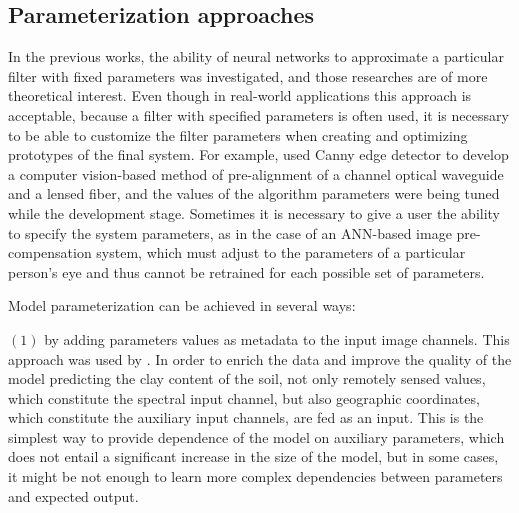 \subsection*{\textbf{Parameterization approaches}}

In the previous works, the ability of neural networks to approximate a particular filter with fixed parameters was investigated, and those researches are of more theoretical interest. Even though in real-world applications this approach is acceptable, because a filter with specified parameters is often used, it is necessary to be able to customize the filter parameters when creating and optimizing prototypes of the final system. For example, \cite{CannyOptics} used Canny edge detector to develop a computer vision-based method of pre-alignment of a channel optical waveguide and a lensed fiber, and the values of the algorithm parameters were being tuned while the development stage. Sometimes it is necessary to give a user the ability to specify the system parameters, as in the case of an ANN-based image pre-compensation system, which must adjust to the parameters of a particular person's eye \citep{Precompensation} and thus cannot be retrained for each possible set of parameters. 


  

Model parameterization can be achieved in several ways:


  $(1)$  by adding parameters values as metadata to the input image channels. This approach was used by \cite{MultipleInputNN_SoilClay2020}. In order to enrich the data and improve the quality of the model predicting the clay content of the soil, not only remotely sensed values, which constitute the spectral input channel, but also geographic coordinates, which constitute the auxiliary input channels, are fed as an input. This is the simplest way to provide dependence of the model on auxiliary parameters, which does not entail a significant increase in the size of the model, but in some cases, it might be not enough to learn more complex dependencies between parameters and expected output.
  
